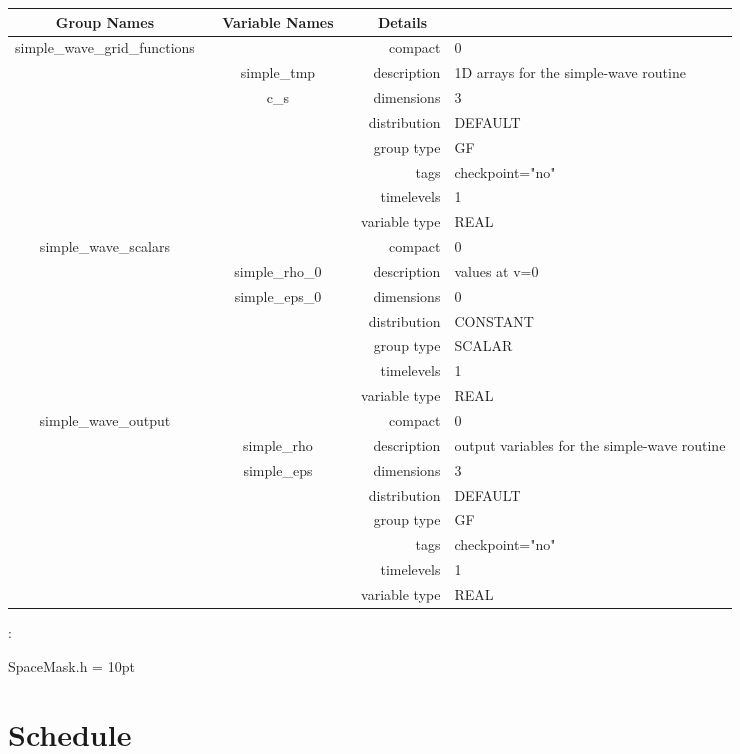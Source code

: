 \documentclass{article}
\begin{document}
\begin{tabular*}{150mm}{|c|c@{\extracolsep{\fill}}|rl|} \hline 
~ {\bf Group Names} ~ & ~ {\bf Variable Names} ~  &{\bf Details} ~ & ~\\ 
\hline 
simple\_wave\_grid\_functions &  & compact & 0 \\ 
 & simple\_tmp & description & 1D arrays for the simple-wave routine \\ 
 & c\_s & dimensions & 3 \\ 
 &  & distribution & DEFAULT \\ 
 &  & group type & GF \\ 
 &  & tags & checkpoint="no" \\ 
 &  & timelevels & 1 \\ 
 &  & variable type & REAL \\ 
\hline 
simple\_wave\_scalars &  & compact & 0 \\ 
 & simple\_rho\_0 & description & values at v=0 \\ 
 & simple\_eps\_0 & dimensions & 0 \\ 
 &  & distribution & CONSTANT \\ 
 &  & group type & SCALAR \\ 
 &  & timelevels & 1 \\ 
 &  & variable type & REAL \\ 
\hline 
simple\_wave\_output &  & compact & 0 \\ 
 & simple\_rho & description & output variables for the simple-wave routine \\ 
 & simple\_eps & dimensions & 3 \\ 
 &  & distribution & DEFAULT \\ 
 &  & group type & GF \\ 
 &  & tags & checkpoint="no" \\ 
 &  & timelevels & 1 \\ 
 &  & variable type & REAL \\ 
\hline 
\end{tabular*} 



\vspace{5mm}

: 

SpaceMask.h
\vspace{2mm}\parskip = 10pt 

\section{Schedule} 
\end{document}
